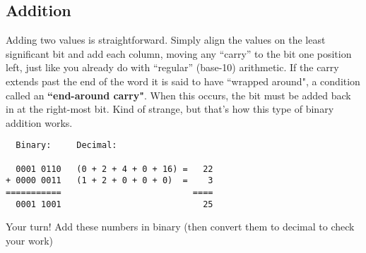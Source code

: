 
\bigskip

\subsection*{Addition}

Adding two values is straightforward. Simply align the values on the least significant bit and add each column, moving any ``carry'' to the bit one position left, just like you already do with ``regular'' (base-10) arithmetic. If the carry extends past the end of the word it is said to have ``wrapped around", a condition called an \textbf{``end-around carry"}. When this occurs, the bit must be added back in at the right-most bit. Kind of strange, but that's how this type of binary addition works. %

\begin{verbatim}
  Binary:     Decimal:
   
  0001 0110   (0 + 2 + 4 + 0 + 16) =   22
+ 0000 0011   (1 + 2 + 0 + 0 + 0)  =    3
===========                          ====
  0001 1001                            25
\end{verbatim}


\bigskip

\noindent Your turn! Add these numbers in binary (then convert them to decimal to check your work)

\bigskip

